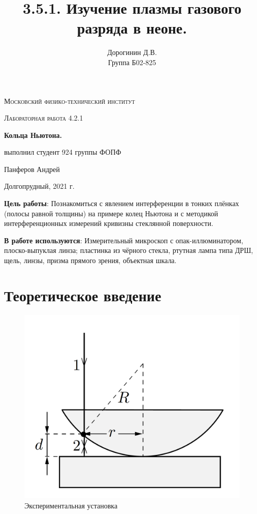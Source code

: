 \documentclass[a4paper,12pt]{article}
\author{Дорогинин Д.В.\\
Группа Б02-825}
\title{3.5.1. Изучение плазмы газового разряда в неоне.}
\date{}
\begin{document}
\begin{titlepage}
	\centering
	\vspace{5cm}
	{\scshape\LARGE Московский физико-технический институт \par}
	\vspace{4cm}
	{\scshape\Large Лабораторная работа 4.2.1 \par}
	\vspace{1cm}
	{\huge\bfseries Кольца Ньютона. \par}
	\vspace{1cm}
	\vfill
\begin{flushright}
	{\large выполнил студент 924 группы ФОПФ}\par
	\vspace{0.3cm}
	{\LARGE Панферов Андрей}
\end{flushright}
	

	\vfill

	Долгопрудный, 2021 г.
\end{titlepage}

\textbf{Цель работы}: Познакомиться с явлением интерференции в тонких плёнках (полосы равной толщины) на примере колец Ньютона и с методикой интерференционных измерений кривизны стеклянной поверхности.

\textbf{В работе используются}: Измерительный микроскоп с опак-иллюминатором, плоско-выпуклая линза; пластинка из чёрного стекла, ртутная лампа типа ДРШ, щель, линзы, призма прямого зрения, объектная шкала.

\section*{Теоретическое введение}
	
	\begin{figure} 
		\includegraphics[width=\linewidth]{ring}
		\caption{Экспериментальная установка}
		\label{ring}
	\end{figure}
\end{document}
